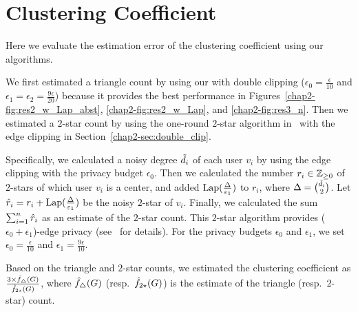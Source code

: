 \section{Clustering Coefficient}
\label{chap2-sec:cluster}
Here we
evaluate the estimation error of the clustering coefficient using our algorithms.

We first estimated a triangle count by using our \AlgTwo{} with double clipping
($\epsilon_0 = \frac{\epsilon}{10}$ and
$\epsilon_1 = \epsilon_2 = \frac{9\epsilon}{20}$)
because it provides the best performance in Figures~\ref{chap2-fig:res2_w_Lap_abst}, \ref{chap2-fig:res2_w_Lap}, and \ref{chap2-fig:res3_n}.
Then we estimated a $2$-star count by
using the one-round $2$-star algorithm in~\cite{Imola_USENIX21} with the
edge clipping in Section~\ref{chap2-sec:double_clip}.

Specifically, we calculated a noisy degree $\tilde{d}_i$ of each user $v_i$ 
by using the edge clipping with the privacy budget $\epsilon_0$.
Then we calculated the number $r_i \in \mathbb{Z}_{\ge0}$ of $2$-stars of which user $v_i$ is a center, and added $\textrm{Lap}(\frac{\Delta}{\varepsilon_1})$ to $r_i$, where $\Delta = \binom{\tilde{d}_i}{2}$.
Let $\hat{r}_i = r_i + \textrm{Lap}(\frac{\Delta}{\varepsilon_1})$ be the noisy $2$-star of $v_i$.
Finally, we calculated
the sum $\sum_{i=1}^n \hat{r}_i$ as an estimate of the $2$-star count.
This $2$-star algorithm provides ($\epsilon_0 + \epsilon_1$)-edge privacy (see~\cite{Imola_USENIX21} for details).
For the privacy budgets $\epsilon_0$ and $\epsilon_1$, we set $\epsilon_0 = \frac{\epsilon}{10}$ and $\epsilon_1 = \frac{9\epsilon}{10}$.

Based on the triangle and $2$-star counts, we estimated the clustering coefficient as
$\frac{3 \times \hat{f}_\triangle(G)}{\hat{f}_{2\star}(G)}$,
where $\hat{f}_\triangle(G)$ (resp.~$\hat{f}_{2\star}(G)$) is the estimate of the triangle (resp.~$2$-star) count.

